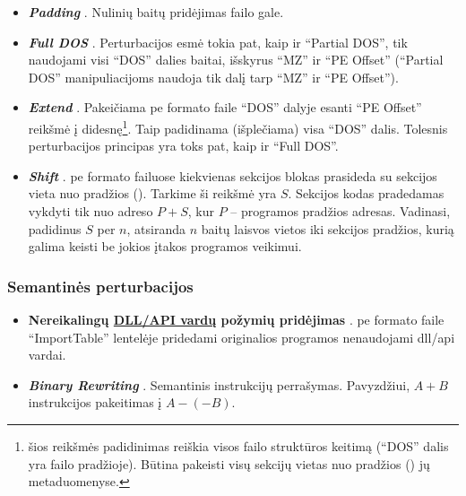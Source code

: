 \begin{itemize}
    \item \textbf{\textit{Padding}} \cite{demetrioAdversarialEXEmplesSurvey2021}. Nulinių baitų pridėjimas failo gale.
    \item \textbf{\textit{Full DOS}} \cite{demetrioAdversarialEXEmplesSurvey2021}. Perturbacijos esmė tokia pat, kaip ir \enquote{Partial DOS}, tik naudojami visi \enquote{DOS} dalies baitai, išskyrus \enquote{MZ} ir \enquote{PE Offset} (\enquote{Partial DOS} manipuliacijoms naudoja tik dalį tarp \enquote{MZ} ir \enquote{PE Offset}).
    \item \textbf{\textit{Extend}} \cite{demetrioAdversarialEXEmplesSurvey2021}. Pakeičiama \acs{pe} formato faile \enquote{DOS} dalyje esanti \enquote{PE Offset} reikšmė į didesnę\footnote{\label{footnote:structure}šios reikšmės padidinimas reiškia visos failo struktūros keitimą (\enquote{DOS} dalis yra failo pradžioje). Būtina pakeisti visų sekcijų vietas nuo pradžios () jų metaduomenyse.}. Taip padidinama (išplečiama) visa \enquote{DOS} dalis. Tolesnis perturbacijos principas yra toks pat, kaip ir \enquote{Full DOS}.
    \item \textbf{\textit{Shift}} \cite{demetrioAdversarialEXEmplesSurvey2021}. \acs{pe} formato failuose kiekvienas sekcijos blokas prasideda su sekcijos vieta nuo pradžios (). Tarkime ši reikšmė yra $S$. Sekcijos kodas pradedamas vykdyti tik nuo adreso $P+S$, kur $P$ -- programos pradžios adresas. Vadinasi, padidinus $S$ per $n$, atsiranda $n$ baitų laisvos vietos iki sekcijos pradžios, kurią galima keisti be jokios įtakos programos veikimui.
\end{itemize}
\subsubsection{Semantinės perturbacijos}\label{sec:literature:perturbations:semantic}
\begin{itemize}
    \item \textbf{Nereikalingų \hyperref[feature:dll]{DLL/API vardų} požymių pridėjimas} \cite{huGeneratingAdversarialMalware2017}. \acs{pe} formato faile \enquote{ImportTable} lentelėje pridedami originalios programos nenaudojami \acs{dll}/\acs{api} vardai.
    \item \textbf{\textit{Binary Rewriting}} \cite{demetrioAdversarialEXEmplesSurvey2021}. Semantinis instrukcijų perrašymas. Pavyzdžiui, $A+B$ instrukcijos pakeitimas į $A-(-B)$.
\end{itemize}

